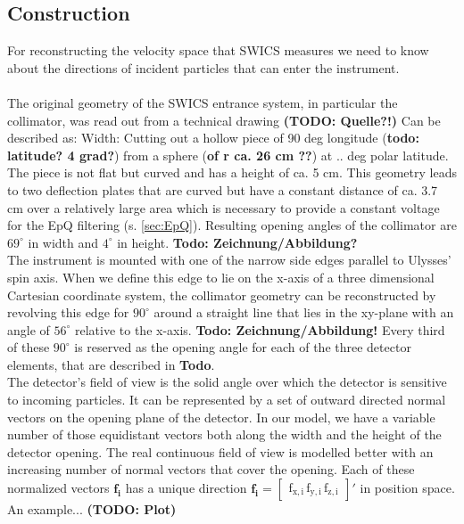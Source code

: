 \subsection{Construction}
For reconstructing the velocity space that SWICS measures we need to know about the directions of incident particles that can enter the instrument.
\\ \\
The original geometry of the SWICS entrance system, in particular the collimator, was read out from a technical drawing \textbf{\textbf{(TODO: Quelle?!})}
Can be described as:
Width: Cutting out a hollow piece of 90 deg longitude (\textbf{todo: latitude? 4 grad?}) from a sphere (\textbf{of r ca. 26 cm ??}) at .. deg polar latitude. The piece is not flat but curved and has a height of ca. 5 cm. This geometry leads to two deflection plates that are curved but have a constant distance of ca. 3.7 cm over a relatively large area which is necessary to provide a constant voltage for the EpQ filtering (s. \ref{sec:EpQ}). Resulting opening angles of the collimator are $69^\circ$ in width and $4^\circ$ in height. \textbf{Todo: Zeichnung/Abbildung?}\\
The instrument is mounted with one of the narrow side edges parallel to Ulysses' spin axis. When we define this edge to lie on the x-axis of a three dimensional Cartesian coordinate system, the collimator geometry can be reconstructed by revolving this edge for $90^\circ$ around a straight line that lies in the xy-plane with an angle of $56^\circ$ relative to the x-axis. \textbf{Todo: Zeichnung/Abbildung!} Every third of these $90^\circ$ is reserved as the opening angle for each of the three detector elements, that are described in \textbf{Todo}.  \\
The detector's field of view is the solid angle over which the detector is sensitive to incoming particles.
It can be represented by a set of outward directed normal vectors on the opening plane of the detector. In our model, we have a variable number of those equidistant vectors both along the width and the height of the detector opening. The real continuous field of view is modelled better with an increasing number of normal vectors that cover the opening. Each of these normalized vectors $\mathrm{\mathbf{f_i}}$ has a unique direction $\mathrm{\mathbf{f_i} = \begin{bmatrix}f_{x,i}\,f_{y,i}\,f_{z,i}\end{bmatrix}}'$ in position space. An example... \textbf{(TODO: Plot)}
\\
